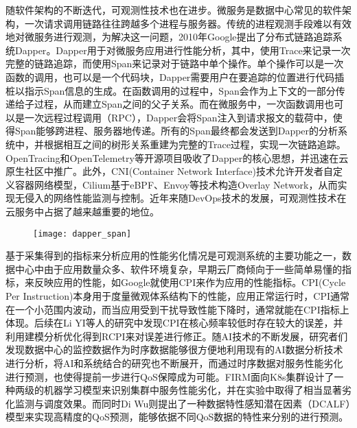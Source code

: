 随软件架构的不断迭代，可观测性技术也在进步。微服务是数据中心常见的软件架构，一次请求调用链路往往跨越多个进程与服务器。传统的进程观测手段难以有效地对微服务进行观测，为解决这一问题，2010年Google提出了分布式链路追踪系统Dapper\citep{sigelman2010dapper}。Dapper用于对微服务应用进行性能分析，其中，使用Trace来记录一次完整的链路追踪，而使用Span来记录对于链路中单个操作。单个操作可以是一次函数的调用，也可以是一个代码块，Dapper需要用户在要追踪的位置进行代码插桩以指示Span信息的生成。在函数调用的过程中，Span会作为上下文的一部分传递给子过程，从而建立Span之间的父子关系。而在微服务中，一次函数调用也可以是一次远程过程调用（RPC），Dapper会将Span注入到请求报文的载荷中，使得Span能够跨进程、服务器地传递。所有的Span最终都会发送到Dapper的分析系统中，并根据相互之间的树形关系重建为完整的Trace过程，实现一次链路追踪。OpenTracing和OpenTelemetry等开源项目吸收了Dapper的核心思想，并迅速在云原生社区中推广。此外，CNI(Container Network Interface)\citep{k8s-network-plugins}技术允许开发者自定义容器网络模型，Cilium\citep{cilium}基于eBPF、Envoy等技术\citep{ebpf,envoyproxy}构造Overlay Network，从而实现无侵入的网络性能监测与控制。近年来随DevOps技术的发展，可观测性技术在云服务中占据了越来越重要的地位。

\begin{figure}[H]
    \centering
    \texttt{[image: dapper\_span]}
    \label{fig:parties_app_dif}
\end{figure}

基于采集得到的指标来分析应用的性能劣化情况是可观测系统的主要功能之一，数据中心中由于应用数量众多、软件环境复杂，早期云厂商倾向于一些简单易懂的指标，来反映应用的性能，如Google就使用CPI\citep{zhang2013cpi2}来作为应用的性能指标。CPI(Cycle Per Instruction)本身用于度量微观体系结构下的性能，应用正常运行时，CPI通常在一个小范围内波动，而当应用受到干扰导致性能下降时，通常就能在CPI指标上体现。后续在Li YI等人的研究中\citep{yi2020cpi}发现CPI在核心频率较低时存在较大的误差，并利用建模分析优化得到RCPI来对误差进行修正。随AI技术的不断发展，研究者们发现数据中心的监控数据作为时序数据能够很方便地利用现有的AI数据分析技术进行分析，将AI和系统结合的研究也不断展开，而通过时序数据对服务性能劣化进行预测\citep{qiu2020firm, zhou2022aquatope, wang2022deepscaling, gan2021sage, ghafouri2020survey,zheng2020web,wu2019posterior}，也使得提前一步进行QoS保障成为可能。FIRM\citep{qiu2020firm}面向K8s集群设计了一种两级的机器学习模型来识别集群中服务性能劣化，并在实验中取得了相当显著劣化监测与调度效果。而同时Di Wu\citep{wu2020data}则提出了一种数据特性感知潜在因素（DCALF）模型来实现高精度的QoS预测，能够依据不同QoS数据的特性来分别的进行预测。

